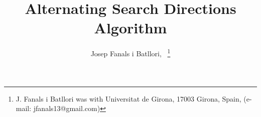 \documentclass[journal]{IEEEtran}
\begin{document}
%
\title{Alternating Search Directions Algorithm}
%
%
%

\author{Josep Fanals i Batllori,~
\thanks{J. Fanals i Batllori was with Universitat de Girona, 17003 Girona, Spain, (e-mail: jfanals13@gmail.com)}}

% 
%



%
% 
\end{document}
